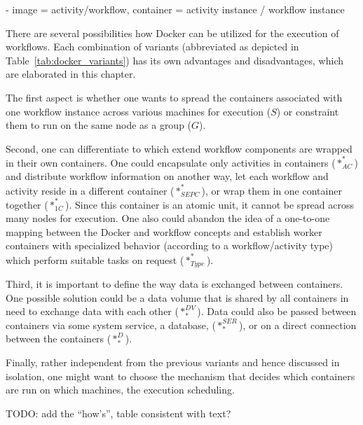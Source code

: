 - image = activity/workflow, container = activity instance / workflow instance

There are several possibilities how Docker can be utilized for the execution of workflows.
Each combination of variants (abbreviated as depicted in Table~\ref{tab:docker_variants}) has its own advantages and disadvantages, which are elaborated in this chapter.

The first aspect is whether one wants to spread the containers associated with one workflow instance across various machines for execution ($S$) or constraint them to run on the same node as a group ($G$).

Second, one can differentiate to which extend workflow components are wrapped in their own containers.
One could encapsulate only activities in containers ($*_{AC}^{*}$) and distribute workflow information on another way, let each workflow and activity reside in a different container ($*_{SEPC}^{*}$), or wrap them in one container together ($*_{1C}^{*}$). Since this container is an atomic unit, it cannot be spread across many nodes for execution. One also could abandon the idea of a one-to-one mapping between the Docker and workflow concepts and establish worker containers with specialized behavior (according to a workflow/activity type) which perform suitable tasks on request ($*_{Type}^{*}$).

Third, it is important to define the way data is exchanged between containers. One possible solution could be a data volume that is shared by all containers in need to exchange data with each other ($*_{*}^{DV}$). Data could also be passed between containers via some system service, \eg a database, ($*_{*}^{SER}$), or on a direct connection between the containers ($*_{*}^{D}$).

Finally, rather independent from the previous variants and hence discussed in isolation, one might want to choose the mechanism that decides which containers are run on which machines, \ie the execution scheduling.

TODO: add the ``how's'', table consistent with text?

